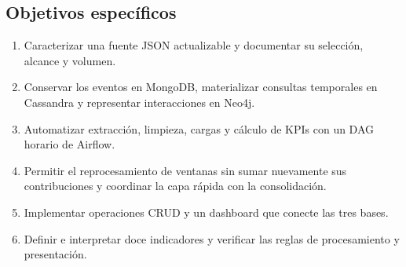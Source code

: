 \subsection{Objetivos específicos}
\begin{enumerate}
\item Caracterizar una fuente JSON actualizable y documentar su selección, alcance y volumen.
\item Conservar los eventos en MongoDB, materializar consultas temporales en Cassandra y representar interacciones en Neo4j.
\item Automatizar extracción, limpieza, cargas y cálculo de KPIs con un DAG horario de Airflow.
\item Permitir el reprocesamiento de ventanas sin sumar nuevamente sus contribuciones y coordinar la capa rápida con la consolidación.
\item Implementar operaciones CRUD y un dashboard que conecte las tres bases.
\item Definir e interpretar doce indicadores y verificar las reglas de procesamiento y presentación.
\end{enumerate}
